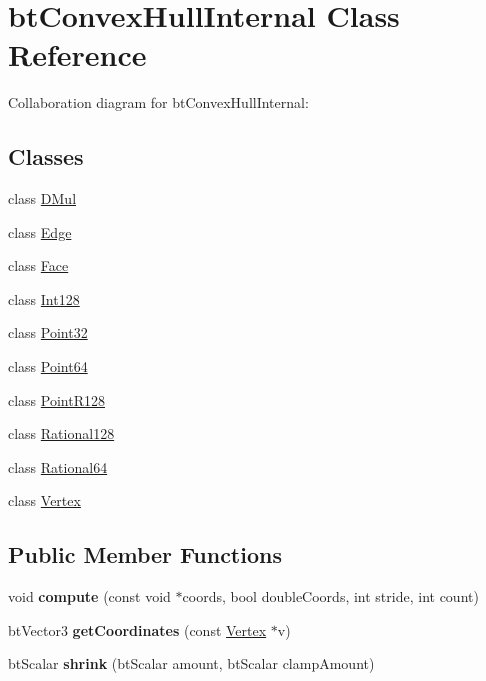 \hypertarget{classbt_convex_hull_internal}{\section{bt\+Convex\+Hull\+Internal Class Reference}
\label{classbt_convex_hull_internal}
}


Collaboration diagram for bt\+Convex\+Hull\+Internal\+:
\subsection*{Classes}
\begin{DoxyCompactItemize}
\item 
class \hyperlink{classbt_convex_hull_internal_1_1_d_mul}{D\+Mul}
\item 
class \hyperlink{classbt_convex_hull_internal_1_1_edge}{Edge}
\item 
class \hyperlink{classbt_convex_hull_internal_1_1_face}{Face}
\item 
class \hyperlink{classbt_convex_hull_internal_1_1_int128}{Int128}
\item 
class \hyperlink{classbt_convex_hull_internal_1_1_point32}{Point32}
\item 
class \hyperlink{classbt_convex_hull_internal_1_1_point64}{Point64}
\item 
class \hyperlink{classbt_convex_hull_internal_1_1_point_r128}{Point\+R128}
\item 
class \hyperlink{classbt_convex_hull_internal_1_1_rational128}{Rational128}
\item 
class \hyperlink{classbt_convex_hull_internal_1_1_rational64}{Rational64}
\item 
class \hyperlink{classbt_convex_hull_internal_1_1_vertex}{Vertex}
\end{DoxyCompactItemize}
\subsection*{Public Member Functions}
\begin{DoxyCompactItemize}
\item 
\hypertarget{classbt_convex_hull_internal_a3193acf9ab8a2416381c0606dda05ccb}{void {\bfseries compute} (const void $\ast$coords, bool double\+Coords, int stride, int count)}\label{classbt_convex_hull_internal_a3193acf9ab8a2416381c0606dda05ccb}

\item 
\hypertarget{classbt_convex_hull_internal_a431da4a67d7c6397a7430f0d0f32ba82}{bt\+Vector3 {\bfseries get\+Coordinates} (const \hyperlink{classbt_convex_hull_internal_1_1_vertex}{Vertex} $\ast$v)}\label{classbt_convex_hull_internal_a431da4a67d7c6397a7430f0d0f32ba82}

\item 
\hypertarget{classbt_convex_hull_internal_a4d735fa92e63b767062df799cb459b4b}{bt\+Scalar {\bfseries shrink} (bt\+Scalar amount, bt\+Scalar clamp\+Amount)}\label{classbt_convex_hull_internal_a4d735fa92e63b767062df799cb459b4b}

\end{DoxyCompactItemize}

